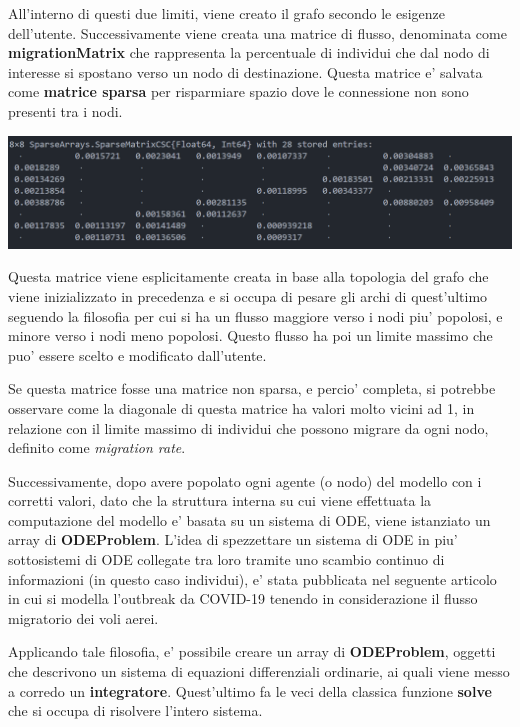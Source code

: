 All'interno di questi due limiti, viene creato il grafo secondo le esigenze dell'utente.
Successivamente viene creata una matrice di flusso, denominata come \textbf{migrationMatrix}
che rappresenta la percentuale di individui che dal nodo di interesse si spostano verso 
un nodo di destinazione. Questa matrice e' salvata come \textbf{matrice sparsa} per risparmiare
spazio dove le connessione non sono presenti tra i nodi. 

\begin{minipage}{\linewidth}
	\centering
	\includegraphics[width=\textwidth]{img/migrationMatrix.png}
	\label{fig:migration matrix}
\end{minipage}

Questa matrice viene esplicitamente creata in base alla topologia del grafo che viene 
inizializzato in precedenza e si occupa di pesare gli archi di quest'ultimo seguendo la 
filosofia per cui si ha un flusso maggiore verso i nodi piu' popolosi, e minore verso i 
nodi meno popolosi. Questo flusso ha poi un limite massimo che puo' essere scelto e 
modificato dall'utente. 

Se questa matrice fosse una matrice non sparsa, e percio' completa, si potrebbe osservare
come la diagonale di questa matrice ha valori molto vicini ad 1, in relazione con il limite
massimo di individui che possono migrare da ogni nodo, definito come \emph{migration rate}.

Successivamente, dopo avere popolato ogni agente (o nodo) del modello con i corretti valori,
dato che la struttura interna su cui viene effettuata la computazione del modello e' basata su 
un sistema di ODE, viene istanziato un array di \textbf{ODEProblem}. L'idea di spezzettare
un sistema di ODE in piu' sottosistemi di ODE collegate tra loro tramite uno scambio continuo 
di informazioni (in questo caso individui), e' stata pubblicata nel seguente articolo \cite{Ding2021}
in cui si modella l'outbreak da COVID-19 tenendo in considerazione il flusso migratorio 
dei voli aerei. 

Applicando tale filosofia, e' possibile creare un array di \textbf{ODEProblem}, oggetti che descrivono
un sistema di equazioni differenziali ordinarie, ai quali viene messo a corredo un \textbf{integratore}. 
Quest'ultimo fa le veci della classica funzione \textbf{solve} che si occupa di risolvere l'intero sistema.

